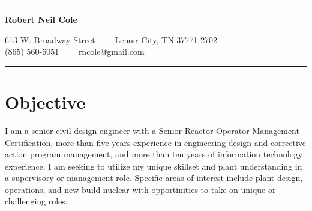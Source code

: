 \documentclass[11pt,letterpaper]{article}
\begin{document}
\chead{}
\rhead{\thepage}
\lfoot{}
\cfoot{}
\rfoot{}
\thispagestyle{empty}

\hrule
\begin{center}
{\LARGE \textbf{Robert Neil Cole}}

613 W. Broadway Street\ \ \textbullet
\ \ Lenoir City, TN 37771-2702
\\
\hspace{.35em}(865) 560-6051\ \ \textbullet
\ \ rncole@gmail.com
\end{center}
\hrule
\vspace{-0.4em}

\section*{Objective}
I am a senior civil design engineer with a Senior Reactor Operator Management Certification, more than five years experience in engineering design and corrective action program management, and more than ten years of information technology experience. I am seeking to utilize my unique skillset and plant understanding in a supervisory or management role.  Specific areas of interest include plant design, operations, and new build nuclear with opportinities to take on unique or challenging roles.
\end{document}
